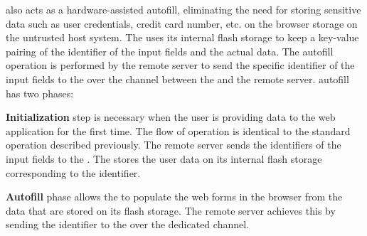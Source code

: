 \device also acts as a hardware-assisted autofill, eliminating the need for storing sensitive data such as user credentials, credit card number, etc. on the browser storage on the untrusted host system. The \device uses its internal flash storage to keep a key-value pairing of the identifier of the input fields and the actual data. The autofill operation is performed by the remote server to send the specific identifier of the input fields to the \device over the \tls channel between the \device and the remote server. \name autofill has two phases: 
\begin{mylist}
\item \textbf{Initialization} step is necessary when the user is providing data to the web application for the first time. The flow of operation is identical to the standard \name operation described previously. The remote server sends the identifiers of the input fields to the \device. The \device stores the user data on its internal flash storage corresponding to the identifier.
\item \textbf{Autofill} phase allows the \device to populate the web forms in the browser from the data that are stored on its flash storage. The remote server achieves this by sending the identifier to the \device over the dedicated \tls channel.
\end{mylist}
\fi


